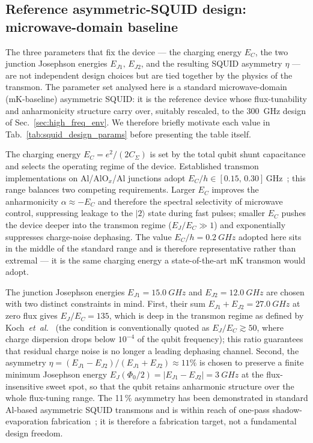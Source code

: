 \subsection{Reference asymmetric-SQUID design: microwave-domain baseline}
\label{sub:tqi_design}

The three parameters that fix the device — the charging energy $E_C$, the
two junction Josephson energies $E_{J1},\,E_{J2}$, and the resulting SQUID
asymmetry $\eta$ — are not independent design choices but are tied together
by the physics of the transmon. The parameter set analysed here is a
standard microwave-domain (mK-baseline) asymmetric SQUID: it is the
reference device whose flux-tunability and anharmonicity structure carry
over, suitably rescaled, to the 300~GHz design of
Sec.~\ref{sec:high_freq_env}. We therefore briefly motivate each value in
Tab.~\ref{tab:squid_design_params} before presenting the table itself.

The charging energy $E_C = e^{2}/(2 C_{\Sigma})$ is set by the total qubit
shunt capacitance and selects the operating regime of the device.
Established transmon implementations on Al/AlO$_x$/Al junctions adopt
$E_C/h \in [0.15,\,0.30]\,\text{GHz}$~\cite{Koch2007Transmon,kjaergaard2020};
this range balances two competing requirements. Larger $E_C$ improves the
anharmonicity $\alpha \approx -E_C$ and therefore the spectral selectivity
of microwave control, suppressing leakage to the
$\lvert 2\rangle$ state during fast pulses; smaller $E_C$ pushes the
device deeper into the transmon regime ($E_J/E_C \gg 1$) and
exponentially suppresses charge-noise dephasing. The value $E_C/h =
\SI{0.2}{GHz}$ adopted here sits in the middle of the standard range and
is therefore representative rather than extremal — it is the same charging
energy a state-of-the-art mK transmon would adopt.

The junction Josephson energies $E_{J1} = \SI{15.0}{GHz}$ and
$E_{J2} = \SI{12.0}{GHz}$ are chosen with two distinct constraints in mind.
First, their sum $E_{J1}+E_{J2}=\SI{27.0}{GHz}$ at zero flux gives
$E_J/E_C = 135$, which is deep in the transmon regime as defined by
Koch~\textit{et~al.}~\cite{Koch2007Transmon} (the condition is conventionally
quoted as $E_J/E_C \gtrsim 50$, where charge dispersion drops below
$10^{-4}$ of the qubit frequency); this ratio guarantees that residual
charge noise is no longer a leading dephasing channel. Second, the
asymmetry $\eta=(E_{J1}-E_{J2})/(E_{J1}+E_{J2})\approx 11\%$ is chosen to
preserve a finite minimum Josephson energy
$E_J(\Phi_0/2) = |E_{J1}-E_{J2}| = \SI{3}{GHz}$ at the
flux-insensitive sweet spot, so that the qubit retains anharmonic
structure over the whole flux-tuning range. The 11\,\% asymmetry has been
demonstrated in standard Al-based asymmetric SQUID transmons and is
within reach of one-pass shadow-evaporation
fabrication~\cite{Hutchings2017,nakamura2011epitaxialNbN};
it is therefore a fabrication target, not a fundamental design freedom.


